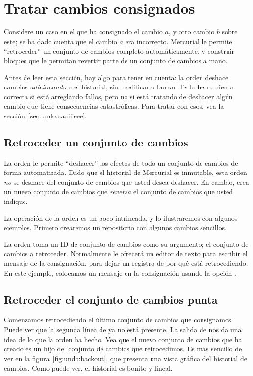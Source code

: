 \section{Tratar cambios consignados}

Considere un caso en el que ha consignado el cambio $a$, y otro cambio
$b$ sobre este; se ha dado cuenta que el cambio $a$ era
incorrecto. Mercurial le permite ``retroceder'' un conjunto de cambios
completo automáticamente, y construir bloques que le permitan revertir
parte de un conjunto de cambios a mano.

Antes de leer esta sección, hay algo para tener en cuenta: la orden
 deshace cambios \emph{adicionando} a el historial, sin
modificar o borrar.  Es la herramienta correcta si está arreglando
fallos, pero no si está tratando de deshacer algún cambio que tiene
consecuencias catastróficas.  Para tratar con esos, vea la sección~\ref{sec:undo:aaaiiieee}.

\subsection{Retroceder un conjunto de cambios}

La orden  le permite ``deshacer'' los efectos de todo
un conjunto de cambios de forma automatizada.  Dado que el historial de
Mercurial es inmutable, esta orden \emph{no} se deshace del conjunto
de cambios que usted desea deshacer.  En cambio, crea un nuevo
conjunto de cambios que \emph{reversa} el conjunto de cambios que
usted indique.

La operación de la orden  es un poco intrincada, y lo
ilustraremos con algunos ejemplos. Primero crearemos un repositorio
con algunos cambios sencillos.

La orden  toma un ID de conjunto de cambios como su
argumento; el conjunto de cambios a retroceder. Normalmente
 le ofrecerá un editor de texto para escribir el
mensaje de la consignación, para dejar un registro de por qué está
retrocediendo. En este ejemplo, colocamos un mensaje en la
consignación usando la opción  .

\subsection{Retroceder el conjunto de cambios punta}

Comenzamos retrocediendo el último conjunto de cambios que consignamos.
Puede ver que la segunda línea de  ya no está
presente.  La salida de  nos da una idea de lo que la orden
 ha hecho.
Vea que el nuevo conjunto de cambios que  ha creado es
un hijo del conjunto de cambios que retrocedimos. Es más sencillo de
ver en la figura~\ref{fig:undo:backout}, que presenta una vista
gráfica del historial de cambios.  Como puede ver, el historial es
bonito y lineal.

